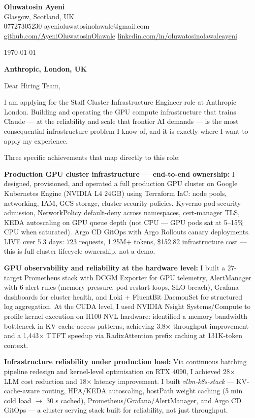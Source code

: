 \documentclass[11pt,a4paper]{article}
\begin{document}
\textbf{Oluwatosin Ayeni}\\
Glasgow, Scotland, UK\\
07727305230 \quad ayenioluwatosinolawale@gmail.com\\
\href{https://github.com/AyeniOluwatosinOlawale}{github.com/AyeniOluwatosinOlawale} \quad
\href{https://www.linkedin.com/in/oluwatosinolawaleayeni/}{linkedin.com/in/oluwatosinolawaleayeni}

\vspace{1em}
\today

\textbf{Anthropic, London, UK}

Dear Hiring Team,

I am applying for the Staff Cluster Infrastructure Engineer role at Anthropic London. Building and operating the GPU compute infrastructure that trains Claude — at the reliability and scale that frontier AI demands — is the most consequential infrastructure problem I know of, and it is exactly where I want to apply my experience.

Three specific achievements that map directly to this role:

\textbf{Production GPU cluster infrastructure — end-to-end ownership:} I designed, provisioned, and operated a full production GPU cluster on Google Kubernetes Engine (NVIDIA L4 24GB) using Terraform IaC: node pools, networking, IAM, GCS storage, cluster security policies. Kyverno pod security admission, NetworkPolicy default-deny across namespaces, cert-manager TLS, KEDA autoscaling on GPU queue depth (not CPU — GPU pods sat at 5--15\% CPU when saturated). Argo CD GitOps with Argo Rollouts canary deployments. LIVE over 5.3 days: 723 requests, 1.25M+ tokens, \$152.82 infrastructure cost — this is full cluster lifecycle ownership, not a demo.

\textbf{GPU observability and reliability at the hardware level:} I built a 27-target Prometheus stack with DCGM Exporter for GPU telemetry, AlertManager with 6 alert rules (memory pressure, pod restart loops, SLO breach), Grafana dashboards for cluster health, and Loki + FluentBit DaemonSet for structured log aggregation. At the CUDA level, I used NVIDIA Nsight Systems/Compute to profile kernel execution on H100 NVL hardware: identified a memory bandwidth bottleneck in KV cache access patterns, achieving 3.8$\times$ throughput improvement and a 1,443$\times$ TTFT speedup via RadixAttention prefix caching at 131K-token context.

\textbf{Infrastructure reliability under production load:} Via continuous batching pipeline redesign and kernel-level optimisation on RTX 4090, I achieved 28$\times$ LLM cost reduction and 18$\times$ latency improvement. I built \textit{vllm-k8s-stack} — KV-cache-aware routing, HPA/KEDA autoscaling, hostPath weight caching (5 min cold load $\to$ 30 s cached), Prometheus/Grafana/AlertManager, and Argo CD GitOps — a cluster serving stack built for reliability, not just throughput.
\end{document}
